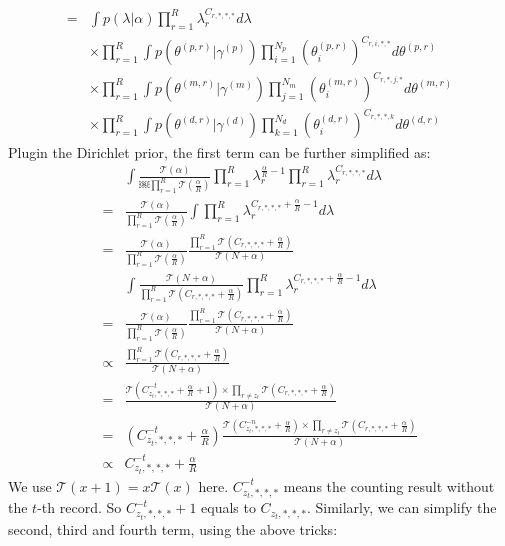 \documentclass[conference]{IEEEtran}
\newcommand\Tau{\mathcal{T}}
\begin{document}
\begin{align*}
= & \int p(\lambda | \alpha) \prod_{r=1}^R \lambda_r^{C_{r, *, *, *}} d\lambda \\ 
& \times \prod_{r=1}^R \int p(\theta^{(p, r)} | \gamma^{(p)}) \prod_{i=1}^{N_p} (\theta_i^{(p, r)})^{C_{r, i, *, *}} d\theta^{(p, r)} \\
& \times \prod_{r=1}^R \int p(\theta^{(m, r)} | \gamma^{(m)}) \prod_{j=1}^{N_m} (\theta_i^{(m, r)})^{C_{r, *, j, *}} d\theta^{(m, r)} \\
& \times \prod_{r=1}^R \int p(\theta^{(d, r)} | \gamma^{(d)}) \prod_{k=1}^{N_d} (\theta_i^{(d, r)})^{C_{r, *, *, k}} d\theta^{(d, r)} 
\end{align*}
Plugin the Dirichlet prior, the first term can be further simplified as:
\begin{align*}
& \int \frac{\Tau(\alpha)}{￼\prod_{r=1}^R\Tau(\frac{\alpha}{R})} \prod_{r=1}^R \lambda_r^{\frac{\alpha}{R} - 1} \prod_{r=1}^R \lambda_r^{C_{r, *, *, *}}
 d\lambda  \\
= & \frac{\Tau(\alpha)}{\prod_{r=1}^R\Tau(\frac{\alpha}{R})} \int \prod_{r=1}^R \lambda_r^{C_{r, *, *, *} + \frac{\alpha}{R} - 1} d\lambda \\
= & \frac{\Tau(\alpha)}{\prod_{r=1}^R\Tau(\frac{\alpha}{R})} \frac{\prod_{r=1}^R\Tau(C_{r, *, *, *} + \frac{\alpha}{R})}{\Tau(N + \alpha)} \\
 & \int \frac{\Tau(N + \alpha)}{\prod_{r=1}^R\Tau(C_{r, *, *, *} + \frac{\alpha}{R})} \prod_{r=1}^R \lambda_r^{C_{r, *, *, *} + \frac{\alpha}{R} - 1} d\lambda \\
= & \frac{\Tau(\alpha)}{\prod_{r=1}^R\Tau(\frac{\alpha}{R})} \frac{\prod_{r=1}^R\Tau(C_{r, *, *, *} + \frac{\alpha}{R})}{\Tau(N + \alpha)} \\
\propto & \frac{\prod_{r=1}^R\Tau(C_{r, *, *, *} + \frac{\alpha}{R})}{\Tau(N + \alpha)} \\
= & \frac{\Tau(C_{z_t, *, *, *}^{-t} + \frac{\alpha}{R} + 1) \times \prod_{r \neq z_t} \Tau (C_{r, *, *, *} + \frac{\alpha}{R})}{\Tau(N + \alpha)} \\
= & (C_{z_t, *, *, *}^{-t} + \frac{\alpha}{R})\frac{\Tau(C_{z_t, *, *, *}^{-n} + \frac{\alpha}{R}) \times \prod_{r \neq z_t} \Tau (C_{r, *, *, *} + \frac{\alpha}{R})}{\Tau(N + \alpha)} \\
\propto & C_{z_t, *, *, *}^{-t} + \frac{\alpha}{R}
\end{align*}
We use $\Tau(x + 1) = x \Tau(x)$ here. $C_{z_t, *, *, *}^{-t}$ means the counting result without the $t$-th record. So $C_{z_t, *, *, *}^{-t} + 1$ equals to $C_{z_t, *, *, *}$. Similarly, we can simplify the second, third and fourth term, using the above tricks:
\end{document}
